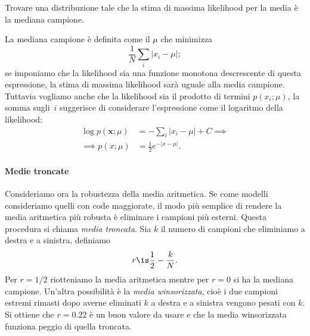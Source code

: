 \begin{exercise}
	Trovare una distribuzione tale che la stima di massima likelihood per la media è la mediana campione.
\end{exercise}

\begin{solution}
	La mediana campione è definita come il $\mu$ che minimizza
	\begin{equation*}
		\frac 1N \sum_i |x_i - \mu|;
	\end{equation*}
	se imponiamo che la likelihood sia una funzione monotona descrescente di questa espressione,
	la stima di massima likelihood sarà uguale alla media campione.
	Tuttavia vogliamo anche che la likelihood sia il prodotto di termini $p(x_i;\mu)$,
	la somma sugli~$i$ suggerisce di considerare l'espressione come il logaritmo della likelihood:
	\begin{align*}
		\log p(\mathbf x;\mu)
		&= -\sum_i |x_i - \mu| + C \implies \\
		\implies p(x;\mu)
		&= \frac12 e^{-|x-\mu|}.
	\end{align*}
\end{solution}

\paragraph{Medie troncate}

Consideriamo ora la robustezza della media aritmetica.
Se come modelli consideriamo quelli con code maggiorate,
il modo più semplice di rendere la media aritmetica più robusta è eliminare i campioni più esterni.
Questa procedura si chiama \emph{media troncata}.
Sia $k$ il numero di campioni che eliminiamo a destra e a sinistra,
definiamo
\begin{equation*}
	r \is \frac12 - \frac kN.
\end{equation*}
Per $r=1/2$ riotteniamo la media aritmetica mentre per $r=0$ si ha la mediana campione.
Un'altra possibilità è la \emph{media winsorizzata},
cioè i due campioni estremi rimasti dopo averne eliminati $k$ a destra e a sinistra vengono pesati con $k$.
Si ottiene che $r=0.22$ è un buon valore da usare e che la media winsorizzata funziona peggio di quella troncata.
%

